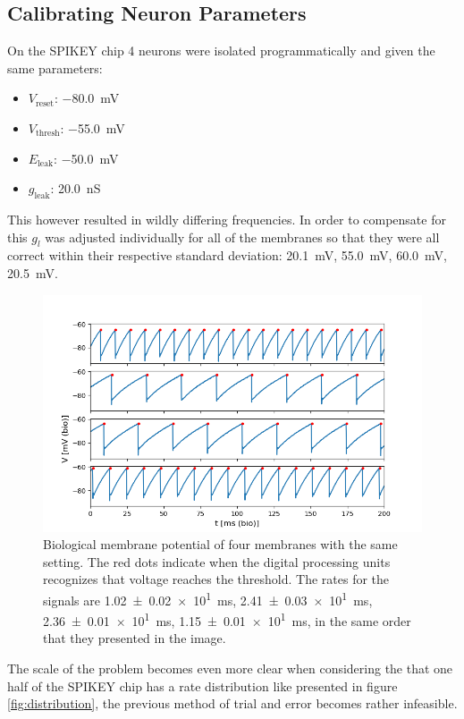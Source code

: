 \documentclass[10pt,a4paper]{article}
\begin{document}
\subsection{Calibrating Neuron Parameters}
On the SPIKEY chip 4 neurons were isolated programmatically and given the same
parameters:
\begin{itemize}
    \item $V_\text{reset}$: \SI{-80.0}{\milli\volt}
    \item $V_\text{thresh}$: \SI{-55.0}{\milli\volt}
    \item $E_\text{leak}$: \SI{-50.0}{\milli\volt}
    \item $g_\text{leak}$:  \SI{20.0}{\nano\siemens}
\end{itemize}
This however resulted in wildly differing frequencies. In order to compensate
for this $g_l$ was adjusted individually for all of the membranes so that they
were all correct within their respective standard deviation:
\SI{20.1}{\milli\volt}, \SI{55.0}{\milli\volt}, \SI{60.0}{\milli\volt},
\SI{20.5}{\milli\volt}.

\begin{figure}[ht]
    \centering
    \includegraphics[width=\textwidth]{figures/4membranes.png}
    \caption{Biological membrane potential of four membranes with the same
    setting. The red dots indicate when the digital processing units recognizes
    that voltage reaches the threshold. The rates for the signals are
    \SI{1.02(2)e1}{\milli\second}, \SI{2.41(3)e1}{\milli\second},
    \SI{2.36(1)e1}{\milli\second}, \SI{1.15(1)e1}{\milli\second}, in the same
    order that they presented in the image. }
    \label{fig:4membranes}
\end{figure}

The scale of the problem becomes even more clear when considering the that one
half of the SPIKEY chip has a rate distribution like presented in figure
\ref{fig:distribution}, the previous method of trial and error becomes rather
infeasible.
\end{document}
